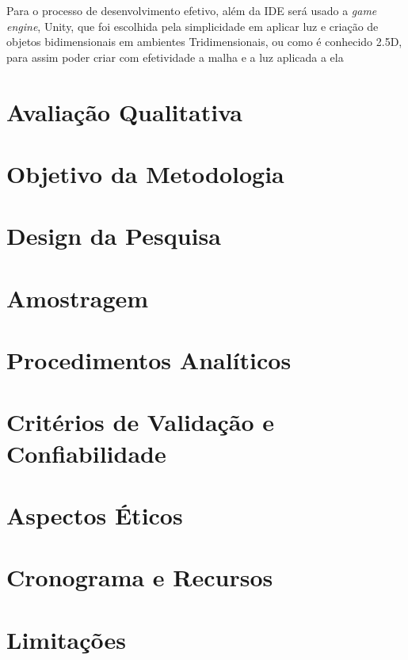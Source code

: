 Para o processo de desenvolvimento efetivo, além da IDE será usado a \textit{game engine}, Unity, que foi escolhida pela simplicidade em aplicar luz e criação de objetos bidimensionais em ambientes Tridimensionais, ou como é conhecido 2.5D, para assim poder criar com efetividade a malha e a luz aplicada a ela

\section{Avaliação Qualitativa}



\section{Objetivo da Metodologia}



\section{Design da Pesquisa}







\section{Amostragem}



\section{Procedimentos Analíticos}



\section{Critérios de Validação e Confiabilidade}



\section{Aspectos Éticos}



\section{Cronograma e Recursos}



\section{Limitações}

